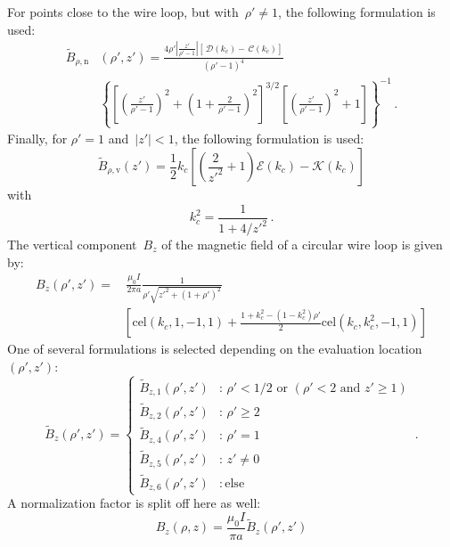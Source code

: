 For points close to the wire loop, but with~$\rho' \neq 1$, the following formulation is used:
\begin{align}
  \tilde{B}_{\rho,\mathrm{n}}& (\rho', z')
  = \frac{4 \rho' \left|\frac{z'}{\rho'-1}\right| \left[ \,\mathcal{D}(k_c) - \,\mathcal{C}(k_c) \right]}
         {(\rho' - 1)^4} \nonumber \\
  ~& \left\{
      \left[ \left( \frac{z'}{\rho'-1} \right)^2 + \left(1 + \frac{2}{\rho'-1} \right)^2 \right]^{3/2}
      \left[ \left( \frac{z'}{\rho'-1} \right)^2 + 1 \right]
    \right\}^{-1} \label{eqn:cwl_B_rho_n} \, .
\end{align}
Finally, for $\rho'=1$ and~$|z'| < 1$, the following formulation is used:
\begin{equation}
  \tilde{B}_{\rho,\mathrm{v}} (z')
  = \frac{1}{2} k_c \left[ \left( \frac{2}{z'^2} + 1 \right) \mathcal{E}(k_c) - \mathcal{K}(k_c) \right] \label{eqn:cwl_B_rho_v}
\end{equation}
with
\begin{equation}
  k_c^2 = \frac{1}{1 + 4/{z'}^2} \, .
\end{equation}
The vertical component~$B_z$ of the magnetic field of a circular wire loop is given by:
\begin{align}
 B_z(\rho', z')
 =&\, \frac{\mu_0 I}{2 \pi a}
   \frac{1}{\rho' \sqrt{z'^2 + (1 + \rho')^2}} \nonumber \\
 ~& \left[
       \textrm{cel}(k_c, 1, -1, 1)
     + \frac{1 + k_c^2 - \left( 1 - k_c^2 \right) \rho'}{2} \textrm{cel}(k_c, k_c^2, -1, 1)
   \right]
\end{align}
One of several formulations is selected depending on the evaluation location~$(\rho', z')$:
\begin{equation}
  \tilde{B}_z(\rho', z')
  = \begin{cases}
      \tilde{B}_{z,1} (\rho', z') &:\, \rho' < 1/2 \textrm{ or } (\rho' < 2 \textrm{ and } z' \geq 1) \\
      \tilde{B}_{z,2} (\rho', z') &:\, \rho' \geq 2 \\
      \tilde{B}_{z,4} (\rho', z') &:\, \rho' = 1 \\
      \tilde{B}_{z,5} (\rho', z') &:\, z' \neq 0 \\
      \tilde{B}_{z,6} (\rho', z') &:\, \textrm{else}
    \end{cases} \, .
\end{equation}
A normalization factor is split off here as well:
\begin{equation}
  B_z(\rho, z) = \frac{\mu_0 I}{\pi a} \tilde{B}_z(\rho', z')
\end{equation}
